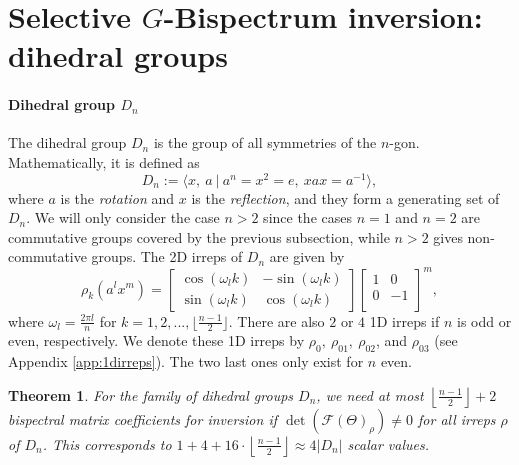 \documentclass{article}
\theoremstyle{plain}
\newtheorem{theorem}{Theorem}[section]
\theoremstyle{definition}
\theoremstyle{remark}
\begin{document}
\section{Selective $G$-Bispectrum inversion: dihedral groups}\label{app:dihedral_inversion}

\paragraph{Dihedral group $D_n$}\label{sec:inversion_dihedral}
The dihedral group $D_n$ is the group of all symmetries of the $n$-gon. Mathematically, it is defined as
\begin{equation}\label{def:dihedral}
    D_n:=\langle x,\ a\ |\ a^n=x^2=e,\ xax = a^{-1}\rangle,
\end{equation}
where $a$ is the \emph{rotation} and $x$ is the \emph{reflection}, and they form a generating set of $D_n$. We will only consider the case $n>2$ since the cases $n=1$ and $n=2$ are commutative groups covered by the previous subsection, while $n>2$ gives non-commutative groups. The 2D irreps of $D_n$ are given by
\begin{equation}\label{eq:2d_irreps_dn}
    \rho_k(a^lx^m)=\begin{bmatrix}
        \cos(\omega_l k)&-\sin(\omega_l k)\\
        \sin(\omega_l k)&\cos(\omega_l k)
    \end{bmatrix}
    \begin{bmatrix}
        1 & 0\\
        0 & -1\\
    \end{bmatrix}^m,
\end{equation}
where $\omega_l = \frac{2\pi l}{n}$ for $k=1,2,...,\lfloor \frac{n-1}{2}\rfloor$. There are also $2$ or $4$ 1D irreps if $n$ is odd or even, respectively. We denote these 1D irreps by $\rho_{0},\ \rho_{01},\ \rho_{02}$, and $\rho_{03}$ (see Appendix \ref{app:1dirreps}). The two last ones only exist for $n$ even.
\begin{theorem}\label{thm:dihedral_inversion}
    For the family of dihedral groups $D_n$, we need at most $\left \lfloor{ \frac{n-1}{2}}\right \rfloor + 2$ bispectral matrix coefficients for inversion if $\det(\mathcal{F}(\Theta)_\rho) \neq 0$ for all irreps $\rho$ of $D_n$. This corresponds to $1+4+16\cdot\left\lfloor{ \frac{n-1}{2}}\right \rfloor\approx 4 |D_n|$ scalar values.
\end{theorem}
\end{document}
